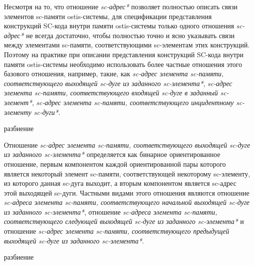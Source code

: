 Несмотря на то, что отношение \textit{sc-адрес*} позволяет полностью описать связи элементов sc-памяти ostis-системы, для спецификации представления конструкций SC-кода внутри памяти ostis-системы только одного отношения \textit{sc-адрес*} не всегда достаточно, чтобы полностью точно и ясно указывать связи между элементами sc-памяти, соответствующими sc-элементам этих конструкций. Поэтому на практике при описании представления конструкций SC-кода внутри памяти ostis-системы необходимо использовать более частные отношения этого базового отношения, например, такие, как \textit{sc-адрес элемента sc-памяти, соответствующего выходящей sc-дуге из заданного sc-элемента*}, \textit{sc-адрес элемента sc-памяти, соответствующего входящей sc-дуге в заданный sc-элемент*}, \textit{sc-адрес элемента sc-памяти, соответствующего инцидентному sc-элементу sc-дуги*}.

\begin{SCn}
\begin{scnrelfromset}{разбиение}
\end{scnrelfromset}
\end{SCn}

Отношение \textit{sc-адрес элемента sc-памяти, соответствующего выходящей sc-дуге из заданного sc-элемента*} определяется как бинарное ориентированное отношение, первым компонентом каждой ориентированной пары которого является некоторый элемент sc-памяти, соответствующей некоторому sc-элементу, из которого данная sc-дуга выходит, а вторым компонентом является sc-адрес этой выходящей sc-дуги. Частными видами этого отношения являются отношение \textit{sc-адреса элемента sc-памяти, соответствующего начальной выходящей sc-дуге из заданного sc-элемента*}, отношение \textit{sc-адреса элемента sc-памяти, соответствующего следующей выходящей sc-дуге из заданного sc-элемента*} и отношение \textit{sc-адрес элемента sc-памяти, соответствующего предыдущей выходящей sc-дуге из заданного sc-элемента*}.

\begin{SCn}
\begin{scnrelfromset}{разбиение}
\end{scnrelfromset}
\end{SCn}

